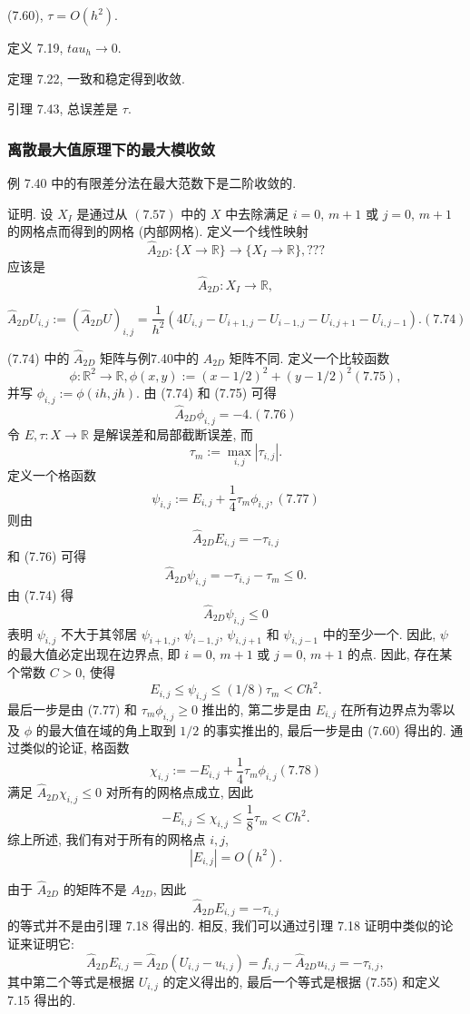 \documentclass[a4paper]{ctexart}
\newcommand{\hl}[1]
{\noindent {\bf {#1}}}
\begin{document}
(7.60), $\tau = O(h^2)$.

定义 7.19, $tau_h \to 0$.

定理 7.22, 一致和稳定得到收敛.

引理 7.43, 总误差是 $\tau$.

\subsubsection{离散最大值原理下的最大模收敛}

\hl{定理7.55} 例 7.40 中的有限差分法在最大范数下是二阶收敛的.

证明. 设 $X_I$ 是通过从 $(7.57)$ 中的 $X$ 中去除满足 $i = 0$, $m+1$ 
或 $j = 0$, $m+1$ 的网格点而得到的网格 (内部网格). 
定义一个线性映射 
$$
\hat{A}_{2D} : \{X \rightarrow \mathbb{R}\} 
\rightarrow \{X_I \rightarrow \mathbb{R}\},  ???
$$
应该是
$$
\hat{A}_{2D} : X_I \rightarrow \mathbb{R},  
$$

$$
\hat{A}_{2D} U_{i,j} := (\hat{A}_{2D} U)_{i,j} 
= \frac{1}{h^2} (4U_{i,j} - U_{i+1,j} - U_{i-1,j} - U_{i,j+1} - U_{i,j-1}).
(7.74)
$$

(7.74) 中的 $\hat{A}_{2D}$ 矩阵与例7.40中的 $A_{2D}$ 矩阵不同.
定义一个比较函数
$$
\phi : \mathbb{R}^2 \rightarrow \mathbb{R}, 
\phi(x, y) := (x - 1/2)^2 + (y - 1/2)^2 (7.75),
$$
并写 
$\phi_{i,j} := \phi(ih, jh)$. 
由 (7.74) 和 (7.75) 可得 
$$
\hat{A}_{2D}\phi_{i,j} = -4. (7.76)
$$
令 $E, \tau : X \rightarrow \mathbb{R}$ 是解误差和局部截断误差, 
而 
$$
\tau_m := \max_{i, j} |\tau_{i, j}|. 
$$
定义一个格函数
$$
\psi_{i,j} := E_{i,j} + \frac14 \tau_m \phi_{i,j}, (7.77)
$$ 
则由
$$
\hat{A}_{2D} E_{i,j} = -\tau_{i,j} 
$$
和 (7.76) 可得
$$
\hat{A}_{2D} \psi_{i,j} = -\tau_{i,j} - \tau_m \leq 0.
$$
由 (7.74) 得 
$$
\hat{A}_{2D} \psi_{i,j} \leq 0
$$
表明 $\psi_{i,j}$ 不大于其邻居 $\psi_{i+1,j}$, 
$\psi_{i-1,j}$, $\psi_{i,j+1}$ 和 $\psi_{i,j-1}$ 
中的至少一个. 因此, $\psi$ 的最大值必定出现在边界点, 
即 $i = 0$, $m + 1$ 或 $j = 0$, $m + 1$ 的点. 
因此, 存在某个常数 $C > 0$, 
使得 
$$
E_{i,j} \leq \psi_{i,j} \leq (1/8) \tau_m < C h^2.
$$
最后一步是由 (7.77) 和 $\tau_m \phi_{i,j} \geq 0$ 推出的, 
第二步是由 $E_{i,j}$ 在所有边界点为零以及 $\phi$ 的最大值在域的角上取到 $1/2$ 
的事实推出的, 最后一步是由 (7.60) 得出的. 
通过类似的论证, 格函数
$$
\chi_{i,j} := -E_{i,j} + \frac14 \tau_m \phi_{i,j} (7.78)
$$
满足 $\hat{A}_{2D} \chi_{i,j} \leq 0$ 
对所有的网格点成立, 因此
$$
-E_{i,j} \leq \chi_{i,j} \leq \frac18 \tau_m < Ch^2.
$$
综上所述, 我们有对于所有的网格点 $i,j$, 
$$
|E_{i,j}| = O(h^2).
$$

由于 $\hat{A}_{2D}$ 的矩阵不是 $A_{2D}$, 
因此 
$$
\hat{A}_{2D} E_{i,j} = -\tau_{i,j}
$$
的等式并不是由引理 7.18 得出的. 相反, 我们可以通过引理 7.18 证明中类似的论证来证明它: 
$$
\hat{A}_{2D} E_{i,j} = \hat{A}_{2D}(U_{i,j} - u_{i,j}) 
= f_{i,j} - \hat{A}_{2D} u_{i,j} = -\tau_{i,j}, 
$$
其中第二个等式是根据 $U_{i,j}$ 的定义得出的, 最后一个等式是根据 (7.55) 和定义 7.15 得出的.
\end{document}

